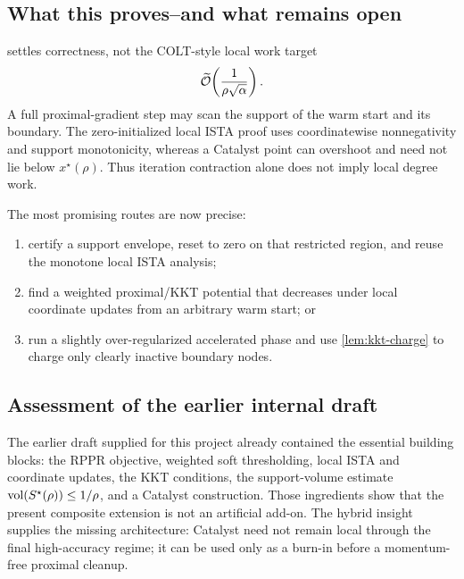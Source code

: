 \subsection{What this proves--and what remains open}

 settles correctness, not the COLT-style
local work target
\begin{equation}
  \widetilde{\mathcal{O}}\!\left(\frac1{\rho\sqrt\alpha}\right).
  \label{eq:rppr-target-work}
\end{equation}
A full proximal-gradient step may scan the support of the warm start and its
boundary.  The zero-initialized local ISTA proof uses coordinatewise
nonnegativity and support monotonicity, whereas a Catalyst point can overshoot
and need not lie below $x^\star(\rho)$.  Thus iteration contraction alone does
not imply local degree work.

The most promising routes are now precise:
\begin{enumerate}[label=(\roman*),leftmargin=2.2em]
  \item certify a support envelope, reset to zero on that restricted region,
        and reuse the monotone local ISTA analysis;
  \item find a weighted proximal/KKT potential that decreases under local
        coordinate updates from an arbitrary warm start; or
  \item run a slightly over-regularized accelerated phase and use
        \cref{lem:kkt-charge} to charge only clearly inactive boundary nodes.
\end{enumerate}

\subsection{Assessment of the earlier internal draft}

The earlier draft supplied for this project already contained the essential
building blocks: the RPPR objective, weighted soft thresholding, local ISTA
and coordinate updates, the KKT conditions, the support-volume estimate
$\operatorname{vol}(S^\star(\rho))\leq1/\rho$, and a Catalyst construction.  Those ingredients
show that the present composite extension is not an artificial add-on.
The hybrid insight supplies the missing architecture: Catalyst need not remain
local through the final high-accuracy regime; it can be used only as a burn-in
before a momentum-free proximal cleanup.

